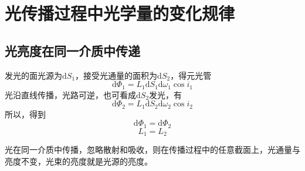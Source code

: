 \documentclass[cn,10pt,chinesefont=founder,math=newtx,cite=super,twoside]{elegantbook}
\begin{document}
\section{光传播过程中光学量的变化规律}
\subsection{光亮度在同一介质中传递}
发光的面光源为$\mathrm{d}S_1$，接受光通量的面积为$\mathrm{d}S_2$，得元光管
\begin{equation}
\mathrm{d}\varPhi_1=L_1\mathrm{d}S_1\mathrm{d}\omega_1\cos i_1
\end{equation}
光沿直线传播，光路可逆，也可看成$\mathrm{d}S_2$发光，有
\begin{equation}
\mathrm{d}\varPhi_2=L_1\mathrm{d}S_2\mathrm{d}\omega_2\cos i_2
\end{equation}
所以，得到
\begin{equation}
\mathrm{d}\varPhi_1=\mathrm{d}\varPhi_2
\end{equation}
\begin{equation}
L_1=L_2
\end{equation}
\begin{conclusion}
光在同一介质中传播，忽略散射和吸收，则在传播过程中的任意截面上，光通量与亮度不变，光束的亮度就是光源的亮度。
\end{conclusion}
\end{document}
